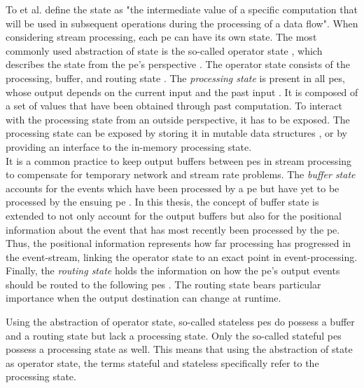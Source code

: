 To et al. \cite{To.2017} define the state as "the intermediate value of a specific computation that will be used in subsequent operations during the processing of a data flow".  When considering stream processing, each \gls{pe} can have its own state. The most commonly used abstraction of state is the so-called operator state \cite{To.2017}, which describes the state from the \gls{pe}'s perspective \cite{To.2017}. The operator state consists of the processing, buffer, and routing state \cite{To.2017}.
The \textit{processing state} is present in all \gls{pe}s, whose output depends on the current input and the past input \cite{CastroFernandez.2013}. It is composed of a set of values that have been obtained through past computation. To interact with the processing state from an outside perspective, it has to be exposed. The processing state can be exposed by storing it in mutable data structures \cite{CastroFernandez.2016}, or by providing an interface to the in-memory processing state.\\
It is a common practice to keep output buffers between \gls{pe}s in stream processing to compensate for temporary network and stream rate problems\cite{CastroFernandez.2013}. The \textit{buffer state} accounts for the events which have been processed by a \gls{pe} but have yet to be processed by the ensuing \gls{pe} \cite{CastroFernandez.2013}. In this thesis, the concept of buffer state is extended to not only account for the output buffers but also for the positional information about the event that has most recently been processed by the \gls{pe}. Thus, the positional information represents how far processing has progressed in the event-stream, linking the operator state to an exact point in event-processing.\\
Finally, the \textit{routing state} holds the information on how the \gls{pe}'s output events should be routed to the following \gls{pe}s \cite{CastroFernandez.2013}. The routing state bears particular importance when the output destination can change at runtime.\par
Using the abstraction of operator state, so-called stateless \gls{pe}s do possess a buffer and a routing state but lack a processing state. Only the so-called stateful \gls{pe}s possess a processing state as well. This means that using the abstraction of state as operator state, the terms stateful and stateless specifically refer to the processing state.\par

